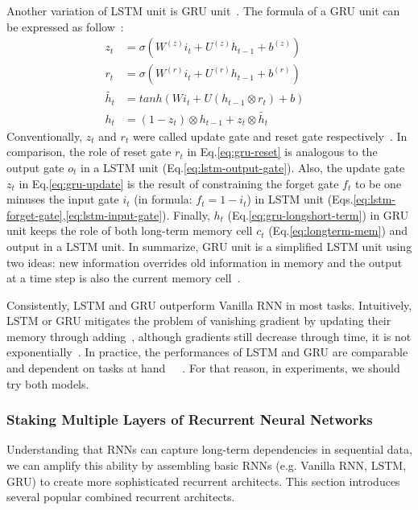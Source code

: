 \label{sec:GRU}
Another variation of LSTM unit is GRU unit~\cite{GRU}. 
The formula of a  GRU unit can be expressed as follow~\cite{colah-lsmt}:
\begin{align}
    z_t &= \sigma(W^{(z)}i_t + U^{(z)}h_{t-1} + b^{(z)}) \label{eq:gru-update}&\\ 
      r_t &= \sigma(W^{(r)}i_t + U^{(r)}h_{t-1} + b^{(r)}) \label{eq:gru-reset}&\\ 
      \tilde{h_t} &= tanh(Wi_t + U(h_{t-1} \otimes r_t) + b) &\\
      h_t &= (1-z_t) \otimes h_{t-1} + z_t \otimes \tilde{h_t} \label{eq:gru-longshort-term}&
\end{align}
Conventionally, \(z_t\) and \(r_t\) were called update gate and reset gate respectively~\cite{GRU}. 
In comparison, the role of reset gate \(r_t\) in Eq.\ref{eq:gru-reset} is analogous to the output gate \(o_t\) in a LSTM unit (Eq.\ref{eq:lstm-output-gate}).  
Also, the update gate \(z_t\) in Eq.\ref{eq:gru-update} is the result of constraining the forget gate \(f_t\) to be one minuses the input gate \(i_t\) (in formula: \(f_t = 1-i_t\)) in LSTM unit (Eqs.\ref{eq:lstm-forget-gate},\ref{eq:lstm-input-gate}).
Finally, \(h_t\) (Eq.\ref{eq:gru-longshort-term}) in GRU unit keeps the role of both long-term memory cell \(c_t\) (Eq.\ref{eq:longterm-mem}) and output in a LSTM unit. 
In summarize, GRU unit is a simplified LSTM unit using two ideas: new information overrides old information in memory and the output at a time step is also the current memory cell~\cite{evaluate-GRU}.  

Consistently, LSTM and GRU outperform Vanilla RNN in most tasks. 
Intuitively, LSTM or GRU mitigates the problem of vanishing gradient by updating their memory through adding~\cite{evaluate-GRU}, although gradients still decrease through time, it is not exponentially~\cite{Graves-thesis}. 
In practice, the performances of LSTM and GRU are comparable and dependent on tasks at hand~\cite{understand-lstm}~\cite{evaluate-GRU}~\cite{lstm-search}. 
For that reason, in experiments, we should try both models. 

\subsubsection{Staking Multiple Layers of Recurrent Neural Networks}
Understanding that RNNs can capture long-term dependencies in sequential data, we can amplify this ability by assembling basic RNNs (e.g. Vanilla RNN, LSTM, GRU) to create more sophisticated recurrent architects.
This section introduces several popular combined recurrent architects.
 
